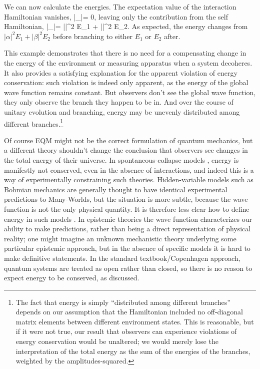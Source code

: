 \documentclass[aps,prd,onecolumn,nofootinbib,notitlepage]{revtex4-1}
\begin{document}
We can now calculate the energies.
The expectation value of the interaction Hamiltonian vanishes,
\be
  \langle\psi |\ham_|\psi\rangle = 0,
\ee
leaving only the contribution from the self Hamiltonian,
\be
  \langle\psi |\ham_|\psi\rangle = |\alpha|^2 E_1 + |\beta|^2 E_2.
\ee
As expected, the energy changes from $|\alpha|^2 E_1 + |\beta|^2 E_2$ before branching to either $E_1$ or $E_2$ after.

This example demonstrates that there is no need for a compensating change in the energy of the environment or measuring apparatus when a system decoheres.
It also provides a satisfying explanation for the apparent violation of energy conservation: such violation is indeed only apparent, as the energy of the global wave function remains constant.
But observers don't see the global wave function, they only observe the branch they happen to be in.
And over the course of unitary evolution and branching, energy may be unevenly distributed among different branches.\footnote{The fact that energy is simply ``distributed among different branches'' depends on our assumption that the Hamiltonian included no off-diagonal matrix elements between different environment states. This is reasonable, but if it were not true, our result that observers can experience violations of energy conservation would be unaltered; we would merely lose the interpretation of the total energy as the sum of the energies of the branches, weighted by the amplitudes-squared.}

Of course EQM might not be the correct formulation of quantum mechanics, but a different theory shouldn't change the conclusion that observers see changes in the total energy of their universe.
In spontaneous-collapse models \cite{Ghirardi:1985mt,Pearle:1988uh,Ghirardi:1989cn}, energy is manifestly not conserved, even in the absence of interactions, and indeed this is a way of experimentally constraining such theories.
Hidden-variable models such as Bohmian mechanics \cite{duerr2009bohmian} are generally thought to have identical experimental predictions to Many-Worlds, but the situation is more subtle, because the wave function is not the only physical quantity.
It is therefore less clear how to define energy in such models \cite{Maudlin:2019bje}.
In epistemic theories \cite{leifer2014quantum} the wave function characterizes our ability to make predictions, rather than being a direct representation of physical reality; one might imagine an unknown mechanistic theory underlying some particular epistemic approach, but in the absence of specific models it is hard to make definitive statements.
In the standard textbook/Copenhagen approach, quantum systems are treated as open rather than closed, so there is no reason to expect energy to be conserved, as discussed.
\end{document}
